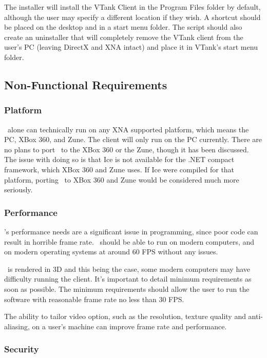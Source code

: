 The installer will install the VTank Client in the Program Files folder by default, although the user may specify a different location if they wish. A shortcut should be placed on the desktop and in a start menu folder. The script should also create an uninstaller that will completely remove the VTank client from the user's PC (leaving DirectX and XNA intact) and place it in VTank's start menu folder. 

\subsection{Non-Functional Requirements}

\subsubsection*{Platform}

\Client\ alone can technically run on any XNA supported platform, which means the PC, XBox 360, and Zune. The client will only run on the PC currently. There are no plans to port \Client\ to the XBox 360 or the Zune, though it has been discussed. The issue with doing so is that Ice is not available for the .NET compact framework, which XBox 360 and Zune uses. If Ice were compiled for that platform, porting \Client\ to XBox 360 and Zune would be considered much more seriously.

\subsubsection*{Performance}

\Client's performance needs are a significant issue in programming, since poor code can result in horrible frame rate. \Client\ should be able to run on modern computers, and on modern operating systems at around 60 FPS without any issues.

\Client\ is rendered in 3D and this being the case, some modern computers may have difficulty running the client. It's important to detail minimum requirements as soon as possible. The minimum requirements should allow the user to run the software with reasonable frame rate no less than 30 FPS. 

The ability to tailor video option, such as the resolution, texture quality and anti-aliasing, on a user's machine can improve frame rate and performance.

\subsubsection*{Security}

